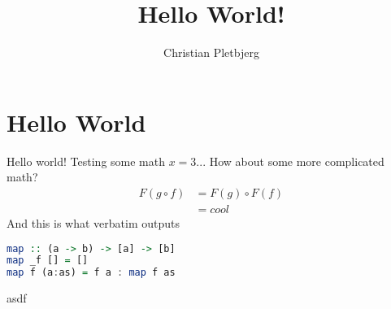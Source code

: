 \documentclass{article}
\title{Hello World!}
\author{Christian Pletbjerg}
\theoremstyle{plain}%
\theoremstyle{definition}
\theoremstyle{remark}
\begin{document}
\maketitle

\section{Hello World}
Hello world! Testing some math $x = 3$... How about some more complicated math?
\begin{align}
    F( g \circ f ) 
        &=  F( g ) \circ F (f )
        \\
        &=  cool
\end{align}
And this is what verbatim outputs
\begin{lstlisting}[language=Haskell]
map :: (a -> b) -> [a] -> [b]
map _f [] = []
map f (a:as) = f a : map f as
\end{lstlisting}

asdf 
\end{document}
